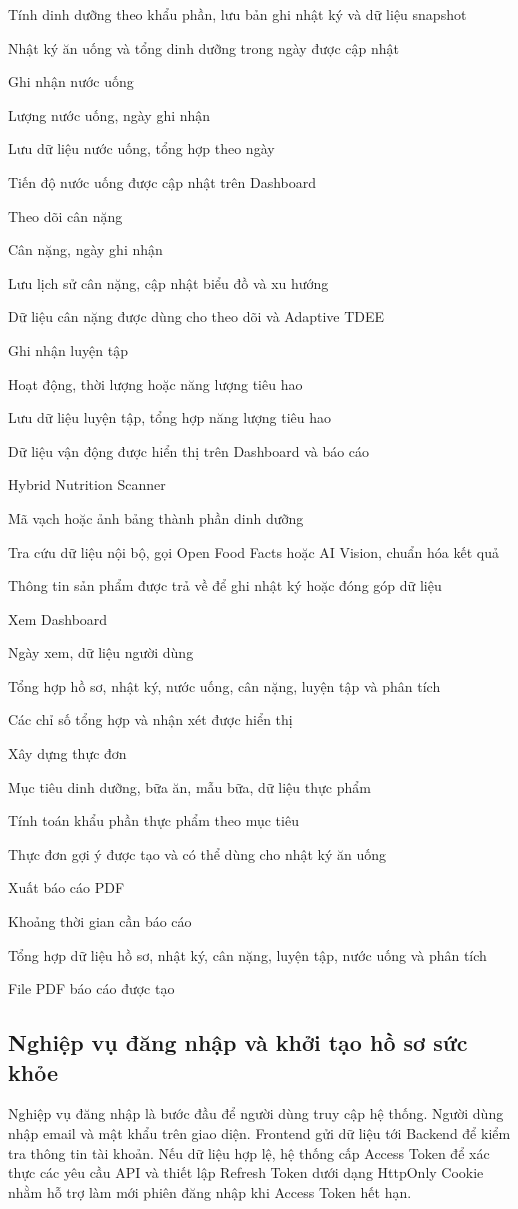 \documentclass[12pt, a4paper]{report}
\begin{document}
Tính dinh dưỡng theo khẩu phần, lưu bản ghi nhật ký và dữ liệu snapshot

Nhật ký ăn uống và tổng dinh dưỡng trong ngày được cập nhật

Ghi nhận nước uống

Lượng nước uống, ngày ghi nhận

Lưu dữ liệu nước uống, tổng hợp theo ngày

Tiến độ nước uống được cập nhật trên Dashboard

Theo dõi cân nặng

Cân nặng, ngày ghi nhận

Lưu lịch sử cân nặng, cập nhật biểu đồ và xu hướng

Dữ liệu cân nặng được dùng cho theo dõi và Adaptive TDEE

Ghi nhận luyện tập

Hoạt động, thời lượng hoặc năng lượng tiêu hao

Lưu dữ liệu luyện tập, tổng hợp năng lượng tiêu hao

Dữ liệu vận động được hiển thị trên Dashboard và báo cáo

Hybrid Nutrition Scanner

Mã vạch hoặc ảnh bảng thành phần dinh dưỡng

Tra cứu dữ liệu nội bộ, gọi Open Food Facts hoặc AI Vision, chuẩn hóa kết quả

Thông tin sản phẩm được trả về để ghi nhật ký hoặc đóng góp dữ liệu

Xem Dashboard

Ngày xem, dữ liệu người dùng

Tổng hợp hồ sơ, nhật ký, nước uống, cân nặng, luyện tập và phân tích

Các chỉ số tổng hợp và nhận xét được hiển thị

Xây dựng thực đơn

Mục tiêu dinh dưỡng, bữa ăn, mẫu bữa, dữ liệu thực phẩm

Tính toán khẩu phần thực phẩm theo mục tiêu

Thực đơn gợi ý được tạo và có thể dùng cho nhật ký ăn uống

Xuất báo cáo PDF

Khoảng thời gian cần báo cáo

Tổng hợp dữ liệu hồ sơ, nhật ký, cân nặng, luyện tập, nước uống và phân tích

File PDF báo cáo được tạo

\subsection{Nghiệp vụ đăng nhập và khởi tạo hồ sơ sức khỏe}Nghiệp vụ đăng nhập là bước đầu để người dùng truy cập hệ thống. Người dùng nhập email và mật khẩu trên giao diện. Frontend gửi dữ liệu tới Backend để kiểm tra thông tin tài khoản. Nếu dữ liệu hợp lệ, hệ thống cấp Access Token để xác thực các yêu cầu API và thiết lập Refresh Token dưới dạng HttpOnly Cookie nhằm hỗ trợ làm mới phiên đăng nhập khi Access Token hết hạn.
\end{document}
